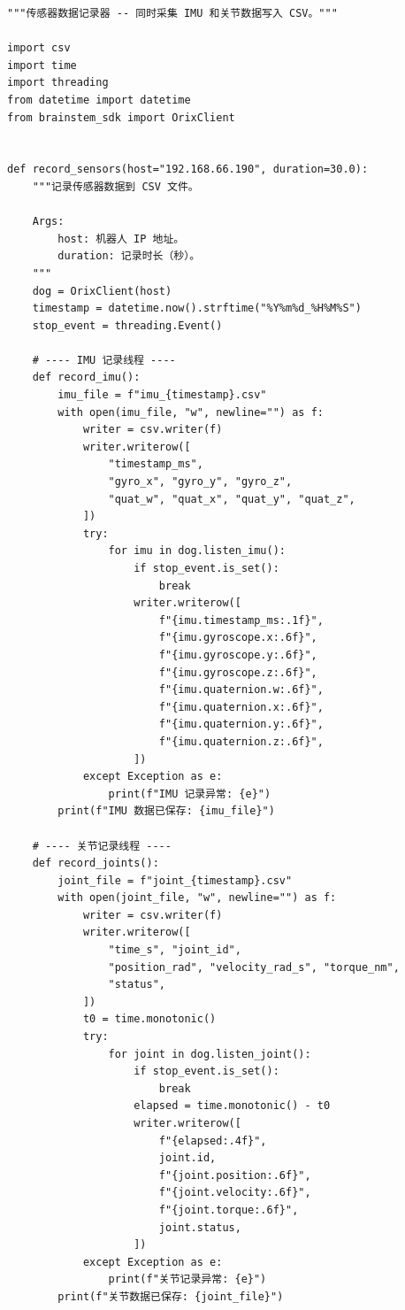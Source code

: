 \documentclass[a4paper,11pt,openany]{book}
\begin{document}
\begin{lstlisting}[style=python]
"""传感器数据记录器 -- 同时采集 IMU 和关节数据写入 CSV。"""

import csv
import time
import threading
from datetime import datetime
from brainstem_sdk import OrixClient


def record_sensors(host="192.168.66.190", duration=30.0):
    """记录传感器数据到 CSV 文件。

    Args:
        host: 机器人 IP 地址。
        duration: 记录时长（秒）。
    """
    dog = OrixClient(host)
    timestamp = datetime.now().strftime("%Y%m%d_%H%M%S")
    stop_event = threading.Event()

    # ---- IMU 记录线程 ----
    def record_imu():
        imu_file = f"imu_{timestamp}.csv"
        with open(imu_file, "w", newline="") as f:
            writer = csv.writer(f)
            writer.writerow([
                "timestamp_ms",
                "gyro_x", "gyro_y", "gyro_z",
                "quat_w", "quat_x", "quat_y", "quat_z",
            ])
            try:
                for imu in dog.listen_imu():
                    if stop_event.is_set():
                        break
                    writer.writerow([
                        f"{imu.timestamp_ms:.1f}",
                        f"{imu.gyroscope.x:.6f}",
                        f"{imu.gyroscope.y:.6f}",
                        f"{imu.gyroscope.z:.6f}",
                        f"{imu.quaternion.w:.6f}",
                        f"{imu.quaternion.x:.6f}",
                        f"{imu.quaternion.y:.6f}",
                        f"{imu.quaternion.z:.6f}",
                    ])
            except Exception as e:
                print(f"IMU 记录异常: {e}")
        print(f"IMU 数据已保存: {imu_file}")

    # ---- 关节记录线程 ----
    def record_joints():
        joint_file = f"joint_{timestamp}.csv"
        with open(joint_file, "w", newline="") as f:
            writer = csv.writer(f)
            writer.writerow([
                "time_s", "joint_id",
                "position_rad", "velocity_rad_s", "torque_nm",
                "status",
            ])
            t0 = time.monotonic()
            try:
                for joint in dog.listen_joint():
                    if stop_event.is_set():
                        break
                    elapsed = time.monotonic() - t0
                    writer.writerow([
                        f"{elapsed:.4f}",
                        joint.id,
                        f"{joint.position:.6f}",
                        f"{joint.velocity:.6f}",
                        f"{joint.torque:.6f}",
                        joint.status,
                    ])
            except Exception as e:
                print(f"关节记录异常: {e}")
        print(f"关节数据已保存: {joint_file}")


\end{lstlisting}
\end{document}
